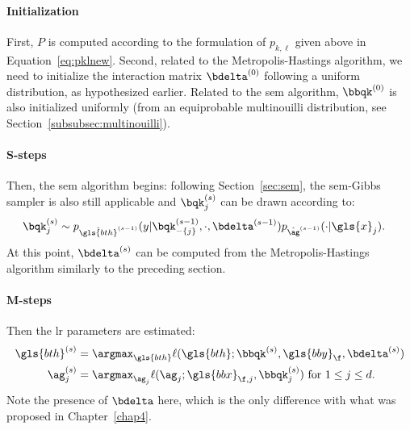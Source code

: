 \paragraph{Initialization}

First, $P$ is computed according to the formulation of $p_{k,\ell}$ given above in Equation~\eqref{eq:pklnew}.
Second, related to the Metropolis-Hastings algorithm, we need to initialize the interaction matrix $\bdelta^{(0)}$ following a uniform distribution, as hypothesized earlier. Related to the \gls{sem} algorithm, $\bbqk^{(0)}$ is also initialized uniformly (from an equiprobable multinouilli distribution, see Section~\ref{subsubsec:multinouilli}).

\paragraph{S-steps}

Then, the \gls{sem} algorithm begins: following Section~\ref{sec:sem}, the \gls{sem}-Gibbs sampler is also still applicable and $\bqk_j^{(s)}$ can be drawn according to: 
\begin{align*}
\bqk_j^{(s)} & \sim p_{\hat{\gls{bth}}^{(s-1)}}(y | \bqk_{-\{j\}}^{(s-1)}, \cdot, \bdelta^{(s-1)}) p_{\hat{\ag}^{(s-1)}}(\cdot | \gls{x}_j).
\end{align*}
At this point, $\bdelta^{(s)}$ can be computed from the Metropolis-Hastings algorithm similarly to the preceding section.

\paragraph{M-steps}

Then the \gls{lr} parameters are estimated:
\begin{align*}
{\gls{bth}}^{(s)} & = \argmax_{\gls{bth}} \ell(\gls{bth} ; \bbqk^{(s)}, \gls{bby}_\f, \bdelta^{(s)}) \\
{\ag}_j^{(s)} & = \argmax_{\ag_j} \ell(\ag_j ; \gls{bbx}_{\f,j}, \bbqk^{(s)}_j) \text{ for } 1 \leq j \leq d.
\end{align*}
Note the presence of $\bdelta$ here, which is the only difference with what was proposed in Chapter~\ref{chap4}.

